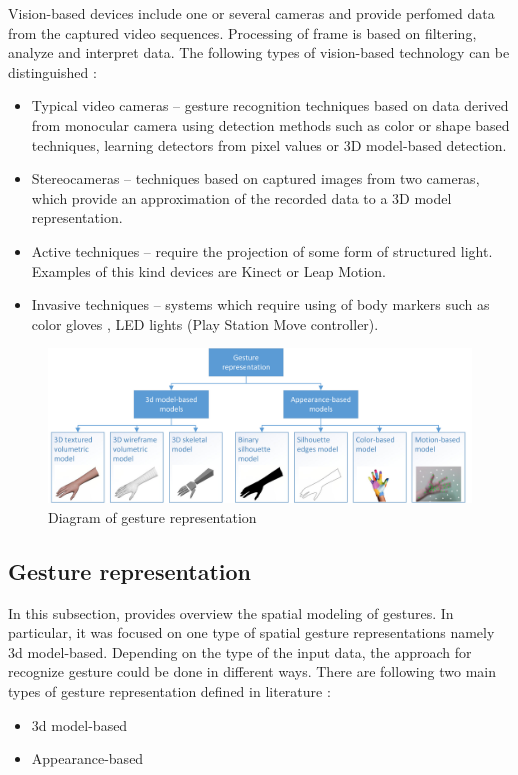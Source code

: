 Vision-based devices include one or several cameras and provide perfomed data from the captured video sequences. Processing of frame is based on filtering, analyze and interpret data. The following types of vision-based technology can be distinguished \cite{kaaniche2009human}\cite{Wu:1999:VGR:647591.728702}:
\begin{itemize}
\item Typical video cameras -- gesture recognition techniques based on data derived from monocular camera using detection methods such as color or shape based techniques, learning detectors from pixel values or 3D model-based detection.
\item Stereocameras -- techniques based on captured images from two cameras, which provide an approximation of the recorded data to a 3D model representation.
\item Active techniques -- require the projection of some form of structured light. Examples of this kind devices are Kinect or Leap Motion.
\item Invasive techniques -- systems which require using of body markers such as color gloves \cite{Wang:2009:RHC:1531326.1531369}, LED lights (Play Station Move controller).
\end{itemize}

\begin{figure}[htb]
\centering
 \includegraphics[width=1\columnwidth]{figures/gestureRepresentations.png}
 \caption[]{Diagram of gesture representation}
 \label{gesturerepresentations}
\end{figure}

\subsection{Gesture representation}
In this subsection, provides overview the spatial modeling of gestures. In particular, it was focused on one type of spatial gesture representations namely 3d model-based.
Depending on the type of the input data, the approach for recognize gesture could be done in different ways.
There are following two main types of gesture representation defined in literature \cite{Huang95handgesture}\cite{Pavlovic97visualinterpretation}:
\begin{itemize}
\item 3d model-based
\item Appearance-based
\end{itemize}

